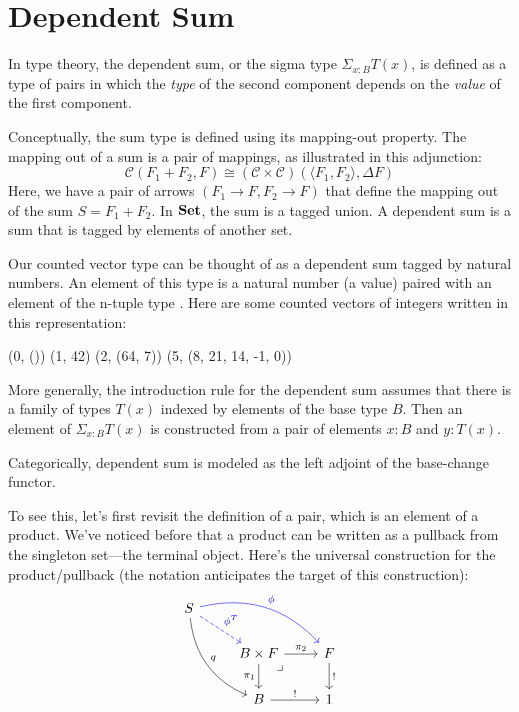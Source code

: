 \documentclass[DaoFP]{subfiles}
\begin{document}
\section{Dependent Sum}

In type theory, the dependent sum, or the sigma type $\Sigma_{x : B} T(x)$, is defined as a type of pairs in which the \emph{type} of the second component depends on the \emph{value} of the first component. 

Conceptually, the sum type is defined using its mapping-out property. The mapping out of a sum is a pair of mappings, as illustrated in this adjunction:
\[ \mathcal{C}(F_1 + F_2, F) \cong (\mathcal{C} \times \mathcal{C}) (\langle F_1, F_2 \rangle, \Delta F) \]
Here, we have a pair of arrows $(F_1 \to F, F_2 \to F)$ that define the mapping out of the sum $S = F_1 + F_2$. In $\mathbf{Set}$, the sum is a tagged union. A dependent sum is a sum that is tagged by elements of another set.

Our counted vector type can be thought of as a dependent sum tagged by natural numbers. An element of this type is a natural number   (a value) paired with an element of the n-tuple type . Here are some counted vectors of integers written in this representation:
\begin{haskell}
(0, ())
(1, 42)
(2, (64, 7))
(5, (8, 21, 14, -1, 0))
\end{haskell}

More generally, the introduction rule for the dependent sum assumes that there is a family of types $T(x)$ indexed by elements of the base type $B$. Then an element of $\Sigma_{x : B} T(x)$ is constructed from a pair of elements $x \colon B$ and $y \colon T(x)$. 

Categorically, dependent sum is modeled as the left adjoint of the base-change functor. 

To see this, let's first revisit the definition of a pair, which is an element of a product. We've noticed before that a product can be written as a pullback from the singleton set---the terminal object. Here's the universal construction for the product/pullback (the notation anticipates the target of this construction):
\[
 \begin{tikzcd}
 S
 \arrow[dr, blue, dashed, "\phi^T"]
 \arrow[drr, blue, bend left, "\phi"]
 \arrow[ddr, bend right, "q"]
 \\
 &B \times F
\arrow[dr, phantom,  , very near start, "\lrcorner"]
 \arrow[r, "\pi_2"]
 \arrow[d, "\pi_1"']
 &F
 \arrow[d, "!"]
 \\
 &B
 \arrow[r, "!"]
 &1
  \end{tikzcd}
\]
\end{document}
